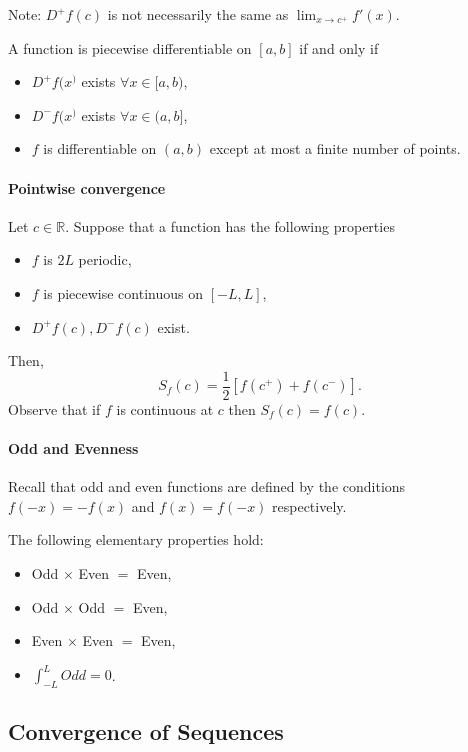 Note: \(D^+ f(c)\) is not necessarily the same as \(\lim_{x\to c^+}f'(x)\).

A function is piecewise differentiable on \([a, b]\) if and only if 
\begin{itemize}
    \item \(D^+f(x^)\) exists \(\forall x\in [a, b)\),
    \item \(D^-f(x^)\) exists \(\forall x\in (a, b]\),
    \item \(f\) is differentiable on \((a, b)\) except at most a finite number of points.
\end{itemize}

\paragraph{Pointwise convergence}
Let \(c\in \mathbb{R}\). Suppose that a function has the following properties

\begin{itemize}
    \item \(f\) is \(2L\) periodic,
    \item \(f\) is piecewise continuous on \([-L, L]\),
    \item \(D^+f(c), D^-f(c)\) exist.
\end{itemize}

Then,
\[
S_f(c) = \frac{1}{2} [f(c^+) + f(c^-)].
\]
Observe that if \(f\) is continuous at \(c\) then \(S_f(c) = f(c)\).

\paragraph{Odd and Evenness} 
Recall that odd and even functions are defined by the conditions \(f(-x) = -f(x)\) and \(f(x) = f(-x)\) respectively.

The following elementary properties hold:
\begin{itemize}
    \item Odd \(\times\) Even \(=\) Even,
    \item Odd \(\times\) Odd \(=\) Even,
    \item Even \(\times\) Even \(=\) Even,
    \item \(\int_{-L}^L Odd = 0\).
\end{itemize}

\subsection{Convergence of Sequences}


